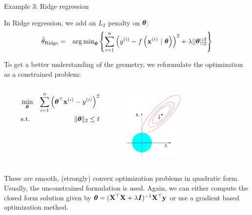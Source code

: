 	\begin{frame}{Example 3: Ridge regression}
		
		In Ridge regression, we add an $L_2$ penalty on $\bm{\theta}$: 
		\vspace*{-0.1cm}
		\begin{eqnarray*}  
			\hat{\theta}_{\text{Ridge}} &=& \operatorname{arg\,min}_{\bm{\theta}} \left\{ \sum\limits_{i=1}^n \left(y^{(i)} - f\left(\mathbf{x}^{(i)} ~|~ \bm{\theta}\right) \right)^2 + \lambda ||\bm{\theta}||_2^2 \right\}
		\end{eqnarray*}

		To get a better understanding of the geometry, we reformulate the optimization as a constrained problem:
		\vspace*{-0.2cm}
		\begin{columns}[T] %
			\begin{column}{.48\textwidth}
				\begin{eqnarray*}
					\min_{\bm{\theta}} && \sum_{i = 1}^n \left(\bm{\theta}^\top \mathbf{x}^{(i)} - y^{(i)}\right)^2 \\
					\text{s.t. } && \|\bm{\theta}\|_2 \le t
				\end{eqnarray*}
				
			\end{column}

			\begin{column}{.48\textwidth}
				\begin{center}
					\includegraphics[width=0.45\textwidth, keepaspectratio]{figure_man/ridge.png} 
				\end{center}
			\end{column}
		\end{columns}
		\pause
These are smooth, (strongly) convex optimization problems in quadratic form. Usually, the unconstrained formulation is used. 
Again, we can either compute the closed form solution given by  $\bm{\theta} = (\mathbf{X}^\top \mathbf{X} + \lambda \bm{I})^{-1}\mathbf{X}^\top \mathbf{y}$ or use a gradient based optimization method.

\end{frame}
	
